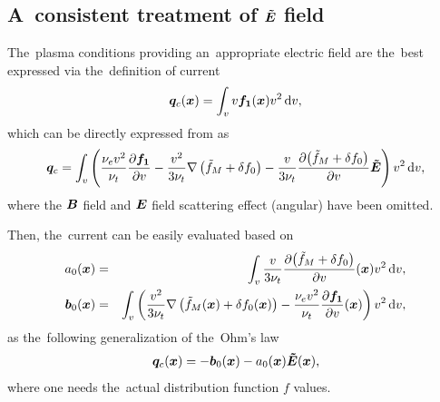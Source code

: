 \subsection{A~consistent treatment of $\boldsymbol{\tilde{E}}$ field}
\label{sec:OOE_E_treatment}
The~plasma conditions providing an~appropriate electric field
are the~best expressed via the~definition of current
\begin{equation}
  \boldsymbol{q}_c(\boldsymbol{x}) = \int_{v}
  v{\boldsymbol{f_1}}(\boldsymbol{x}) v^2\, \text{d}v , 
  \nonumber 
\end{equation}
which can be directly expressed from  as
\begin{equation}
  \boldsymbol{q}_c =
  \int_{v} \left(\frac{\nu_{e}v^2}{\nu_{t}}\frac{\partial{{\boldsymbol{f_1}}}}{\partial{v}}
  - \frac{v^2}{3\nu_{t}}\nabla\left(\tilde{f}_M + \delta f_0\right) - 
  \frac{v}{3\nu_{t}}\frac{\partial{\left(\tilde{f}_M+ \delta f_0\right)}}{\partial{v}}\boldsymbol{\tilde{E}}
  \right) v^2\, \text{d}v ,
  \label{eq:OOE_P1current}
\end{equation}
where the $\boldsymbol{B}$ field and $\boldsymbol{E}$ field scattering effect (angular) have been 
omitted.  

Then, the~current can be easily evaluated based on
\begin{eqnarray}
  a_0(\boldsymbol{x}) &=& \int_{v}\frac{v}{3 \nu_{t}} \frac{\partial{\left(\tilde{f}_M+ \delta f_0\right)}}{\partial{v}}(\boldsymbol{x})
  v^2\, \text{d}v , \nonumber \\
  \boldsymbol{b}_{0}(\boldsymbol{x}) &=& \int_{v}\left(  
  \frac{v^2}{3 \nu_{t}}\nabla\left(\tilde{f}_M(\boldsymbol{x}) + \delta f_0(\boldsymbol{x})\right)
  - \frac{\nu_{e}v^2}{\nu_{t}}\frac{\partial{{\boldsymbol{f_1}}}}{\partial{v}}(\boldsymbol{x})
  \right)v^2\, \text{d}v , \nonumber 
\end{eqnarray}
as the~following generalization of the~Ohm's law
\begin{equation}
  \boldsymbol{q}_c(\boldsymbol{x}) 
  = -\boldsymbol{b}_{0}(\boldsymbol{x}) 
  - a_{0}(\boldsymbol{x})\boldsymbol{\tilde{E}}(\boldsymbol{x}) ,
  \nonumber \label{eq:OOE_HOFcurrent}
\end{equation}
where one needs the~actual distribution function $f$ values.


